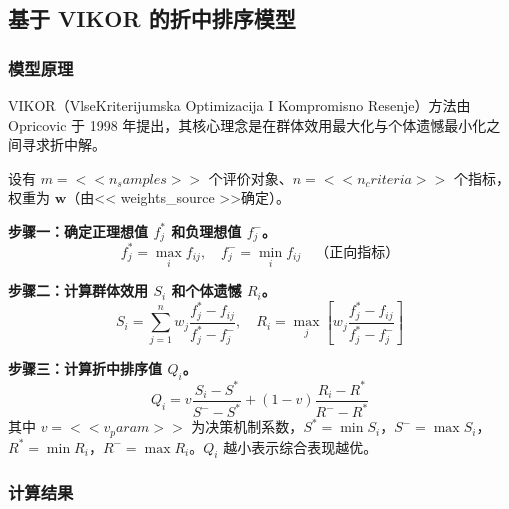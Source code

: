 
\subsection{基于 VIKOR 的折中排序模型}

\subsubsection{模型原理}

VIKOR（VlseKriterijumska Optimizacija I Kompromisno Resenje）方法由 Opricovic 于 1998 年提出，其核心理念是在群体效用最大化与个体遗憾最小化之间寻求折中解。

设有 $m = << n_samples >>$ 个评价对象、$n = << n_criteria >>$ 个指标，权重为 $\mathbf{w}$（由<< weights_source >>确定）。

\textbf{步骤一：确定正理想值 $f_j^*$ 和负理想值 $f_j^-$。}
\begin{equation}
    f_j^* = \max_i f_{ij}, \quad f_j^- = \min_i f_{ij} \quad \text{（正向指标）}
\end{equation}

\textbf{步骤二：计算群体效用 $S_i$ 和个体遗憾 $R_i$。}
\begin{equation}
    S_i = \sum_{j=1}^{n} w_j \frac{f_j^* - f_{ij}}{f_j^* - f_j^-}, \quad
    R_i = \max_j \left[ w_j \frac{f_j^* - f_{ij}}{f_j^* - f_j^-} \right]
\end{equation}

\textbf{步骤三：计算折中排序值 $Q_i$。}
\begin{equation}
    Q_i = v \frac{S_i - S^*}{S^- - S^*} + (1 - v) \frac{R_i - R^*}{R^- - R^*}
    \label{eq:vikor_Q}
\end{equation}
其中 $v = << v_param >>$ 为决策机制系数，$S^* = \min S_i$，$S^- = \max S_i$，$R^* = \min R_i$，$R^- = \max R_i$。$Q_i$ 越小表示综合表现越优。

\subsubsection{计算结果}

